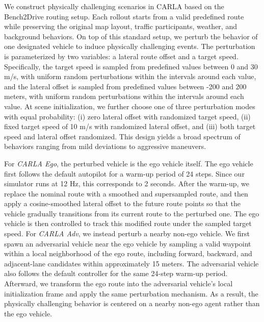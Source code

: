 \documentclass[runningheads]{llncs}
\begin{document}
We construct physically challenging scenarios in CARLA \cite{Dosovitskiy2017carla} based on the Bench2Drive \cite{jia2024bench2drive} routing setup. Each rollout starts from a valid predefined route while preserving the original map layout, traffic participants, weather, and background behaviors. On top of this standard setup, we perturb the behavior of one designated vehicle to induce physically challenging events. The perturbation is parameterized by two variables: a lateral route offset and a target speed. Specifically, the target speed is sampled from predefined values between 0 and 30 m/s, with uniform random perturbations within the intervals around each value, and the lateral offset is sampled from predefined values between -200 and 200 meters, with uniform random perturbations within the intervals around each value. At scene initialization, we further choose one of three perturbation modes with equal probability: (i) zero lateral offset with randomized target speed, (ii) fixed target speed of 10 m/s with randomized lateral offset, and (iii) both target speed and lateral offset randomized. This design yields a broad spectrum of behaviors ranging from mild deviations to aggressive maneuvers.

For \textit{CARLA Ego}, the perturbed vehicle is the ego vehicle itself. The ego vehicle first follows the default autopilot for a warm-up period of 24 steps. Since our simulator runs at 12 Hz, this corresponds to 2 seconds. After the warm-up, we replace the nominal route with a smoothed and supersampled route, and then apply a cosine-smoothed lateral offset to the future route points so that the vehicle gradually transitions from its current route to the perturbed one. The ego vehicle is then controlled to track this modified route under the sampled target speed. For \textit{CARLA Adv}, we instead perturb a nearby non-ego vehicle. We first spawn an adversarial vehicle near the ego vehicle by sampling a valid waypoint within a local neighborhood of the ego route, including forward, backward, and adjacent-lane candidates within approximately 15 meters. The adversarial vehicle also follows the default controller for the same 24-step warm-up period. Afterward, we transform the ego route into the adversarial vehicle's local initialization frame and apply the same perturbation mechanism. As a result, the physically challenging behavior is centered on a nearby non-ego agent rather than the ego vehicle.
\end{document}
